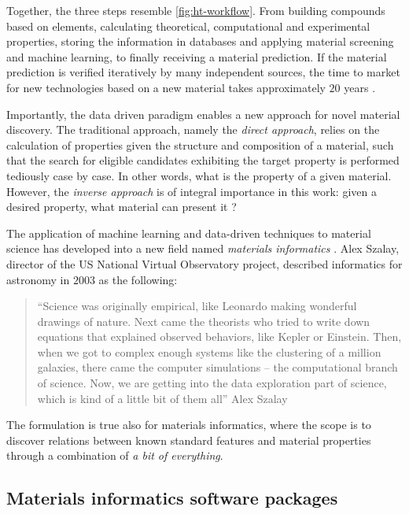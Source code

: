 \noindent Together, the three steps resemble \autoref{fig:ht-workflow}. From building compounds based on elements, calculating theoretical, computational and experimental properties, storing the information in databases and applying material screening and machine learning, to finally receiving a material prediction. If the material prediction is verified iteratively by many independent sources, the time to market for new technologies based on a new material takes approximately $20$ years \cite{Eagar1995, Schleder2019}.

Importantly, the data driven paradigm enables a new approach for novel material discovery. The traditional approach, namely the \textit{direct approach}, relies on the calculation of properties given the structure and composition of a material, such that the search for eligible candidates exhibiting the target property is performed tediously case by case. In other words, what is the property of a given material. However, the \textit{inverse approach} is of integral importance in this work: given a desired property, what material can present it \cite{Schleder2019}?

The application of machine learning and data-driven techniques to material science has developed into a new field named \textit{materials informatics} \cite{Rajan2005}. Alex Szalay, director of the US National Virtual Observatory project, described informatics for astronomy in $2003$ as the following:
\begin{quote}
   ``Science was originally empirical, like Leonardo making wonderful drawings of nature. Next came the theorists who tried to write down equations that explained observed behaviors, like Kepler or Einstein. Then, when we got to complex enough systems like the clustering of a million galaxies, there came the computer simulations – the computational branch of science. Now, we are getting into the data exploration part of science, which is kind of a little bit of them all'' Alex Szalay \cite{Szalay2003}
\end{quote}
\noindent The formulation is true also for materials informatics, where the scope is to discover relations between known standard features and material properties through a combination of \emph{a bit of everything}.

\subsection{Materials informatics software packages}

